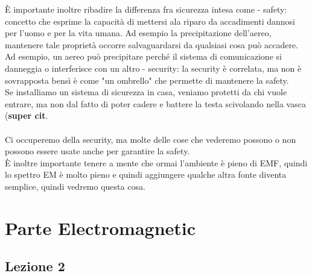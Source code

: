 \documentclass[oneside, 12pt]{extbook}
\begin{document}
È importante inoltre ribadire la differenza fra sicurezza intesa come
- safety: concetto che esprime la capacità di mettersi ala riparo da accadimenti dannosi per l'uomo e per la vita umana. Ad esempio la precipitazione dell'aereo, mantenere tale proprietà occorre salvaguardarsi da qualsiasi cosa può accadere. Ad esempio, un aereo può precipitare perché il sistema di comunicazione si danneggia o interferisce con un altro 
- security: la security è correlata, ma non è sovrapposta bensì è come "un ombrello" che permette di mantenere la safety.\\Se installiamo un sistema di sicurezza in casa, veniamo protetti da chi vuole entrare, ma non dal fatto di poter cadere e battere la testa scivolando nella vasca (\textbf{super cit}.\\\\Ci occuperemo della security, ma molte delle cose che vederemo possono o non possono essere usate anche per garantire la safety.\\È inoltre importante tenere a mente che ormai l'ambiente è pieno di EMF, quindi lo spettro EM è molto pieno e quindi aggiungere qualche altra fonte diventa semplice, quindi vedremo questa cosa.

\part{Parte Electromagnetic}
\chapter{Lezione 2}
\end{document}
